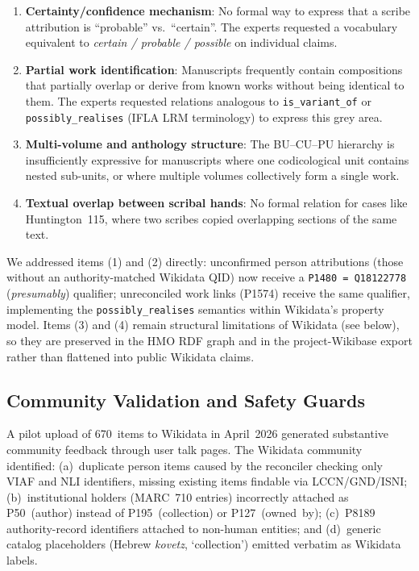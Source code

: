 \documentclass[Afour,sageh,times]{sagej}
\begin{document}
\begin{enumerate}[leftmargin=*]
\item \textbf{Certainty/confidence mechanism}: No formal way to express that a scribe attribution is ``probable'' vs.\ ``certain''. The experts requested a vocabulary equivalent to \emph{certain / probable / possible} on individual claims.
\item \textbf{Partial work identification}: Manuscripts frequently contain compositions that partially overlap or derive from known works without being identical to them. The experts requested relations analogous to \texttt{is\_variant\_of} or \texttt{possibly\_realises} (IFLA LRM terminology) to express this grey area.
\item \textbf{Multi-volume and anthology structure}: The BU--CU--PU hierarchy is insufficiently expressive for manuscripts where one codicological unit contains nested sub-units, or where multiple volumes collectively form a single work.
\item \textbf{Textual overlap between scribal hands}: No formal relation for cases like Huntington~115, where two scribes copied overlapping sections of the same text.
\end{enumerate}

We addressed items (1) and (2) directly: unconfirmed person attributions (those without an authority-matched Wikidata QID) now receive a \texttt{P1480~=~Q18122778} (\emph{presumably}) qualifier; unreconciled work links (P1574) receive the same qualifier, implementing the \texttt{possibly\_realises} semantics within Wikidata's property model. Items (3) and (4) remain structural limitations of Wikidata (see below), so they are preserved in the HMO RDF graph and in the project-Wikibase export rather than flattened into public Wikidata claims.

\subsection{Community Validation and Safety Guards}

A pilot upload of 670~items to Wikidata in April~2026 generated substantive community feedback through user talk pages. The Wikidata community identified: (a)~duplicate person items caused by the reconciler checking only VIAF and NLI identifiers, missing existing items findable via LCCN/GND/ISNI; (b)~institutional holders (MARC~710 entries) incorrectly attached as P50~(author) instead of P195~(collection) or P127~(owned~by); (c)~P8189 authority-record identifiers attached to non-human entities; and (d)~generic catalog placeholders (Hebrew \textit{kovetz}, `collection') emitted verbatim as Wikidata labels.
\end{document}
